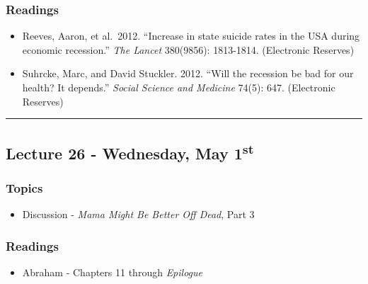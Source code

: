 \documentclass[]{book}
\providecommand{\tightlist}{%
  \setlength{\itemsep}{0pt}\setlength{\parskip}{0pt}}
\begin{document}
\hypertarget{readings-27}{%
\subsubsection*{Readings}\label{readings-27}}

\begin{itemize}
\tightlist
\item
  Reeves, Aaron, et al.~2012. ``Increase in state suicide rates in the USA during economic recession.'' \emph{The Lancet} 380(9856): 1813-1814. (Electronic Reserves)
\item
  Suhrcke, Marc, and David Stuckler. 2012. ``Will the recession be bad for our health? It depends.'' \emph{Social Science and Medicine} 74(5): 647. (Electronic Reserves)
\end{itemize}

\begin{center}\rule{0.5\linewidth}{\linethickness}\end{center}

\hypertarget{lecture-26---wednesday-may-1st}{%
\subsection*{\texorpdfstring{Lecture 26 - Wednesday, May 1\textsuperscript{st}}{Lecture 26 - Wednesday, May 1st}}\label{lecture-26---wednesday-may-1st}}

\hypertarget{topics-30}{%
\subsubsection*{Topics}\label{topics-30}}

\begin{itemize}
\tightlist
\item
  Discussion - \emph{Mama Might Be Better Off Dead}, Part 3
\end{itemize}

\hypertarget{readings-28}{%
\subsubsection*{Readings}\label{readings-28}}

\begin{itemize}
\tightlist
\item
  Abraham - Chapters 11 through \emph{Epilogue}
\end{itemize}
\end{document}

